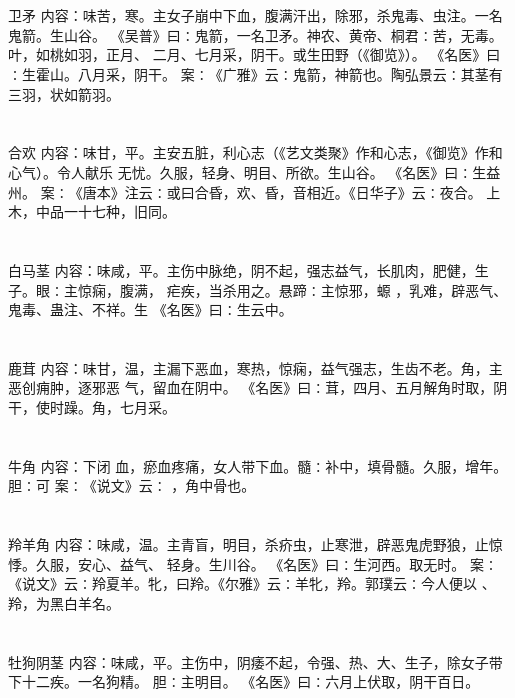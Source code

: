 \documentclass[12pt,UTF8]{ctexbook}
\begin{document}
\chapter{}卫矛
内容：味苦，寒。主女子崩中下血，腹满汗出，除邪，杀鬼毒、虫注。一名鬼箭。生山谷。 
《吴普》曰∶鬼箭，一名卫矛。神农、黄帝、桐君∶苦，无毒。叶，如桃如羽，正月、 
二月、七月采，阴干。或生田野（《御览》）。 
《名医》曰∶生霍山。八月采，阴干。 
案∶《广雅》云∶鬼箭，神箭也。陶弘景云∶其茎有三羽，状如箭羽。 


\chapter{}合欢
内容：味甘，平。主安五脏，利心志（《艺文类聚》作和心志，《御览》作和心气）。令人献乐 
无忧。久服，轻身、明目、所欲。生山谷。 
《名医》曰∶生益州。 
案∶《唐本》注云∶或曰合昏，欢、昏，音相近。《日华子》云∶夜合。 
上木，中品一十七种，旧同。 


\chapter{}白马茎
内容：味咸，平。主伤中脉绝，阴不起，强志益气，长肌肉，肥健，生子。眼∶主惊痫，腹满， 
疟疾，当杀用之。悬蹄∶主惊邪，螈 ，乳难，辟恶气、鬼毒、蛊注、不祥。生 
《名医》曰∶生云中。 


\chapter{}鹿茸
内容：味甘，温，主漏下恶血，寒热，惊痫，益气强志，生齿不老。角，主恶创痈肿，逐邪恶 
气，留血在阴中。 
《名医》曰∶茸，四月、五月解角时取，阴干，使时躁。角，七月采。 


\chapter{}牛角
内容：下闭 
血，瘀血疼痛，女人带下血。髓∶补中，填骨髓。久服，增年。胆∶可 
案∶《说文》云∶ ，角中骨也。 


\chapter{}羚羊角
内容：味咸，温。主青盲，明目，杀疥虫，止寒泄，辟恶鬼虎野狼，止惊悸。久服，安心、益气、 
轻身。生川谷。 
《名医》曰∶生河西。取无时。 
案∶《说文》云∶羚夏羊。牝，曰羚。《尔雅》云∶羊牝，羚。郭璞云∶今人便以 、 
羚，为黑白羊名。 


\chapter{}牡狗阴茎
内容：味咸，平。主伤中，阴痿不起，令强、热、大、生子，除女子带下十二疾。一名狗精。 
胆∶主明目。 
《名医》曰∶六月上伏取，阴干百日。 
\end{document}
